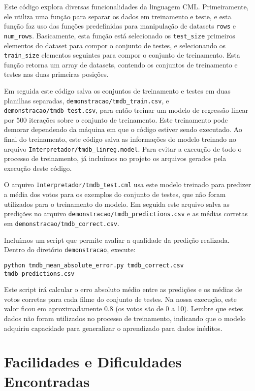 \documentclass[12pt]{article}
\begin{document}
Este código explora diversas funcionalidades da linguagem CML.  Primeiramente, ele utiliza uma função para separar os dados em treinamento e teste, e esta função faz uso das funções predefinidas para manipulação de datasets \texttt{rows} e \texttt{num\_rows}. Basicamente, esta função está selecionado os \texttt{test\_size} primeiros elementos do dataset para compor o conjunto de testes, e selecionando os \texttt{train\_size} elementos seguintes para compor o conjunto de treinamento. Esta função retorna um array de datasets, contendo os conjuntos de treinamento e testes nas duas primeiras posições.

Em seguida este código salva os conjuntos de treinamento e testes em duas planilhas separadas, \texttt{demonstracao/tmdb\_train.csv}, e \texttt{demonstracao/tmdb\_test.csv}, para então treinar um modelo de regressão linear por 500 iterações sobre o conjunto de treinamento. Este treinamento pode demorar dependendo da máquina em que o código estiver sendo executado. Ao final do treinamento, este código salva as informações do modelo treinado no arquivo \texttt{Interpretador/tmdb\_linreg.model}. Para evitar a execução de todo o processo de treinamento, já incluímos no projeto os arquivos gerados pela execução deste código.

O arquivo \texttt{Interpretador/tmdb\_test.cml} usa este modelo treinado para predizer a média dos votos para os exemplos do conjunto de testes, que não foram utilizados para o treinamento do modelo. Em seguida este arquivo salva as predições no arquivo \texttt{demonstracao/tmdb\_predictions.csv} e as médias corretas em \texttt{demonstracao/tmdb\_correct.csv}.

Incluímos um script que permite avaliar a qualidade da predição realizada. Dentro do diretório \texttt{demonstracao}, execute:

\begin{verbatim}
python tmdb_mean_absolute_error.py tmdb_correct.csv tmdb_predictions.csv
\end{verbatim}

Este script irá calcular o erro absoluto médio entre as predições e os médias de votos corretas para cada filme do conjunto de testes. Na nossa execução, este valor ficou em aproximadamente 0.8 (os votos são de 0 a 10). Lembre que estes dados não foram utilizados no processo de treinamento, indicando que o modelo adquiriu capacidade para generalizar o aprendizado para dados inéditos.

\section{Facilidades e Dificuldades Encontradas}
\end{document}
